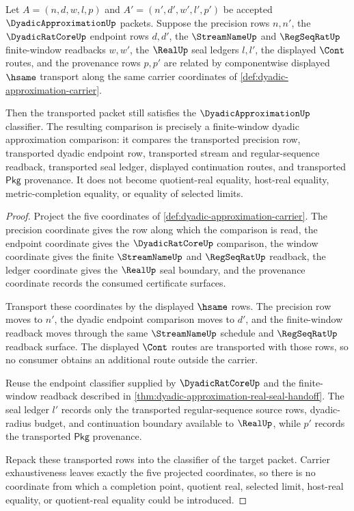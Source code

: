 \begin{theorem}
\label{thm:dyadic-approximation-classifier-transport}
Let $A=(n,d,w,l,p)$ and $A'=(n',d',w',l',p')$ be accepted $\DyadicApproximationUp$ packets. Suppose the precision rows $n,n'$, the $\DyadicRatCoreUp$ endpoint rows $d,d'$, the $\StreamNameUp$ and $\RegSeqRatUp$ finite-window readbacks $w,w'$, the $\RealUp$ seal ledgers $l,l'$, the displayed $\Cont$ routes, and the provenance rows $p,p'$ are related by componentwise displayed $\hsame$ transport along the same carrier coordinates of \autoref{def:dyadic-approximation-carrier}.

Then the transported packet still satisfies the $\DyadicApproximationUp$ classifier. The resulting comparison is precisely a finite-window dyadic approximation comparison: it compares the transported precision row, transported dyadic endpoint row, transported stream and regular-sequence readback, transported seal ledger, displayed continuation routes, and transported $\mathsf{Pkg}$ provenance. It does not become quotient-real equality, host-real equality, metric-completion equality, or equality of selected limits.
\end{theorem}
\begin{proof}
Project the five coordinates of \autoref{def:dyadic-approximation-carrier}. The precision coordinate gives the row along which the comparison is read, the endpoint coordinate gives the $\DyadicRatCoreUp$ comparison, the window coordinate gives the finite $\StreamNameUp$ and $\RegSeqRatUp$ readback, the ledger coordinate gives the $\RealUp$ seal boundary, and the provenance coordinate records the consumed certificate surfaces.

Transport these coordinates by the displayed $\hsame$ rows. The precision row moves to $n'$, the dyadic endpoint comparison moves to $d'$, and the finite-window readback moves through the same $\StreamNameUp$ schedule and $\RegSeqRatUp$ readback surface. The displayed $\Cont$ routes are transported with those rows, so no consumer obtains an additional route outside the carrier.

Reuse the endpoint classifier supplied by $\DyadicRatCoreUp$ and the finite-window readback described in \autoref{thm:dyadic-approximation-real-seal-handoff}. The seal ledger $l'$ records only the transported regular-sequence source rows, dyadic-radius budget, and continuation boundary available to $\RealUp$, while $p'$ records the transported $\mathsf{Pkg}$ provenance.

Repack these transported rows into the classifier of the target packet. Carrier exhaustiveness leaves exactly the five projected coordinates, so there is no coordinate from which a completion point, quotient real, selected limit, host-real equality, or quotient-real equality could be introduced.
\end{proof}

